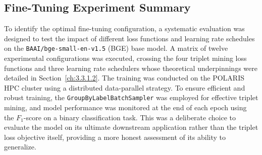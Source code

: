 \subsection{Fine-Tuning Experiment Summary}\label{ch:4.4.1}
To identify the optimal fine-tuning configuration, a systematic evaluation was designed to test the impact of different loss functions and learning rate schedules on the \verb|BAAI/bge-small-en-v1.5| (BGE) base model. A matrix of twelve experimental configurations was executed, crossing the four triplet mining loss functions and three learning rate schedulers whose theoretical underpinnings were detailed in Section~\ref{ch:3.3.1.2}. The training was conducted on the POLARIS HPC cluster using a distributed data-parallel strategy. To ensure efficient and robust training, the \verb|GroupByLabelBatchSampler| was employed for effective triplet mining, and model performance was monitored at the end of each epoch using the \(F_1\)-score on a binary classification task. This was a deliberate choice to evaluate the model on its ultimate downstream application rather than the triplet loss objective itself, providing a more honest assessment of its ability to generalize.

